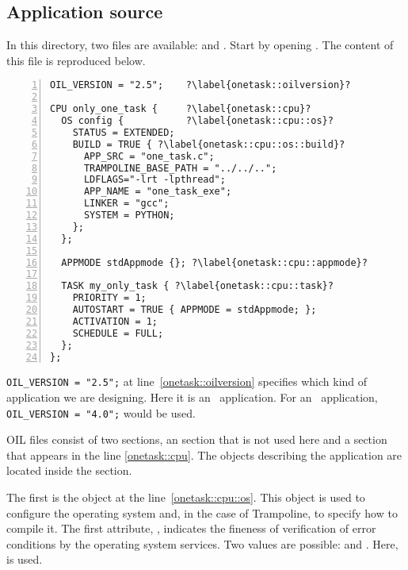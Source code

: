 \subsection{Application source}

In this directory, two files are available:  and . Start by opening . The content of this file is reproduced below. 

\begin{lstlisting}[language=OIL,numbers=left,escapechar=?]
OIL_VERSION = "2.5"; 	?\label{onetask::oilversion}?

CPU only_one_task {  	?\label{onetask::cpu}?
  OS config {			?\label{onetask::cpu::os}?
    STATUS = EXTENDED;
    BUILD = TRUE { ?\label{onetask::cpu::os::build}?
      APP_SRC = "one_task.c";
      TRAMPOLINE_BASE_PATH = "../../..";
      LDFLAGS="-lrt -lpthread";
      APP_NAME = "one_task_exe";
      LINKER = "gcc";
      SYSTEM = PYTHON;
    };
  };
  
  APPMODE stdAppmode {}; ?\label{onetask::cpu::appmode}?
  
  TASK my_only_task { ?\label{onetask::cpu::task}?
    PRIORITY = 1;
    AUTOSTART = TRUE { APPMODE = stdAppmode; };
    ACTIVATION = 1;
    SCHEDULE = FULL;
  };
};
\end{lstlisting}

\lstinline[language=OIL]{OIL_VERSION = "2.5";} at line~\ref{onetask::oilversion} specifies which kind of application we are designing. Here it is an \osek\ application. For an \autosar\ application, \lstinline[language=OIL]{OIL_VERSION = "4.0";} would be used.

OIL files consist of two sections, an  section that is not used here and a  section that appears in the line \ref{onetask::cpu}. The objects describing the application are located inside the  section.

The first is the  object at the line~\ref{onetask::cpu::os}. This object is used to configure the operating system and, in the case of Trampoline, to specify how to compile it. The first attribute, , indicates the fineness of verification of error conditions by the operating system services. Two values are possible:  and . Here,  is used.

